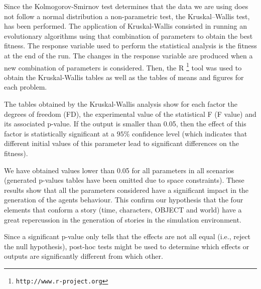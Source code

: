 \documentclass[runningheads,a4paper]{llncs}
\begin{document}
Since the Kolmogorov-Smirnov test determines that the data we are using
does not follow a normal distribution a non-parametric test, the Kruskal–Wallis test, has been
performed.  %
The application of Kruskal-Wallis consisted in running an evolutionary
algorithms using that combination of parameters to obtain the best
fitness. %
The response variable used to perform the statistical analysis is the
fitness at the end of the run. The changes in the response variable
are produced when a new combination of parameters is considered. Then,
the {R} \footnote{{\tt http://www.r-project.org}} tool was used to
obtain the Kruskal-Wallis tables as well as the tables of means and
figures for each problem. 

The tables obtained by the Kruskal-Wallis analysis show for each factor the  degrees of freedom (FD), the experimental value of the statistical F (F value) and its associated p-value. If the output is smaller than 0.05, then the
effect of this factor is statistically significant at a $95\%$
confidence level (which indicates that different initial values of
this parameter lead to significant differences on the fitness).

We have obtained values lower than 0.05 for all parameters in all scenarios (generated p-values tables have been omitted due to space constraints). These results show that all the parameters considered have a significant
impact in the generation of the agents behaviour. This confirm our hypothesis that the four elements that conform a story (time, characters, OBJECT and world) have a great repercussion in the generation of stories in the simulation environment. %

Since a significant p-value only tells  that the effects are not all
equal (i.e., reject the null hypothesis), post-hoc tests might be used
to determine which effects or outputs are significantly different from
which other. %
\end{document}
